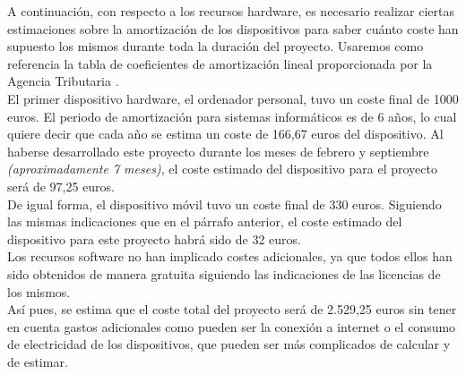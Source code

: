 A continuación, con respecto a los recursos hardware, es necesario realizar ciertas estimaciones sobre la amortización de los dispositivos para saber cuánto coste han supuesto los mismos durante toda la duración del proyecto. Usaremos como referencia la tabla de coeficientes de amortización lineal proporcionada por la Agencia Tributaria \cite{amortizacion-agencia-tributaria}.\\

El primer dispositivo hardware, el ordenador personal, tuvo un coste final de 1000 euros. El periodo de amortización para sistemas informáticos es de 6 años, lo cual quiere decir que cada año se estima un coste de 166,67 euros del dispositivo. Al haberse desarrollado este proyecto durante los meses de febrero y septiembre \textit{(aproximadamente 7 meses)}, el coste estimado del dispositivo para el proyecto será de 97,25 euros.\\

De igual forma, el dispositivo móvil tuvo un coste final de 330 euros. Siguiendo las mismas indicaciones que en el párrafo anterior, el coste estimado del dispositivo para este proyecto habrá sido de 32 euros.\\

Los recursos software no han implicado costes adicionales, ya que todos ellos han sido obtenidos de manera gratuita siguiendo las indicaciones de las licencias de los mismos.\\

Así pues, se estima que el coste total del proyecto será de 2.529,25 euros sin tener en cuenta gastos adicionales como pueden ser la conexión a internet o el consumo de electricidad de los dispositivos, que pueden ser más complicados de calcular y de estimar.